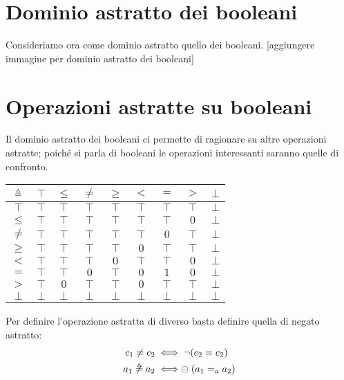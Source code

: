 \section{Dominio astratto dei booleani}

Consideriamo ora come dominio astratto quello dei booleani.
[aggiungere immagine per dominio astratto dei booleani]

\section{Operazioni astratte su booleani}

Il dominio astratto dei booleani ci permette di ragionare
su altre operazioni astratte;
poiché si parla di booleani le operazioni interessanti
saranno quelle di confronto. 

\begin{definizione}
\end{definizione}
\begin{center}
	\begin{tabular}{ c | c c c c c c c c }
		$\mathrel{\triangleq}$ & $\top$ & $\leq$ & $\neq$ & $\geq$ & $<$ & $=$ & $>$ & $\bot$ \\
		\hline
		$\top$ & $\top$ & $\top$ & $\top$ & $\top$ & $\top$ & $\top$ & $\top$ & $\bot$ \\
		$\leq$ & $\top$ & $\top$ & $\top$ & $\top$ & $\top$ & $\top$ & $0$ & $\bot$\\
		$\neq$ & $\top$ & $\top$ & $\top$ & $\top$ & $\top$ & $0$ & $\top$ & $\bot$\\
		$\geq$ & $\top$ & $\top$ & $\top$ & $\top$ & $0$ & $\top$ & $\top$ & $\bot$\\
		$<$ & $\top$ & $\top$ & $\top$ & $0$ & $\top$ & $\top$ & $0$ & $\bot$\\
		$=$ & $\top$ & $\top$ & $0$ & $\top$ & $0$ & $1$ & $0$ & $\bot$\\
		$>$ & $\top$ & $0$ & $\top$ & $\top$ & $0$ & $\top$ & $\top$ & $\bot$\\
		$\bot$ & $\bot$ & $\bot$ & $\bot$ & $\bot$ & $\bot$ & $\bot$ & $\bot$ & $\bot$
	\end{tabular}
\end{center}


\begin{definizione}
Per definire l'operazione astratta di diverso basta definire quella di negato astratto:
\begin{align*}
	c_1 \neq c_2 &\iff \neg (c_2 = c_2) \\
	a_1 \mathrel{\not\triangleq} a_2 &\iff \mathrel{\circleddash} (a_1 =_a a_2)
\end{align*}
\end{definizione}

